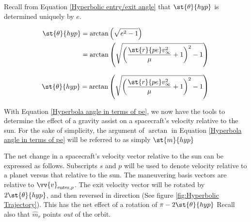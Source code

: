 \documentclass[../basicOrbitalDynamics.tex]{subfiles}
\begin{document}
Recall from Equation \eqref{Hyperbolic entry/exit angle} that $\st{\theta}{hyp}$ is determined uniquely by $e$.

\begin{align*}
    \st{\theta}{hyp} & =\arctan\left(\sqrt{e^2-1}\right)                                                \\
                      & =\arctan\left(\sqrt{\left(\frac{\st{r}{pe}v_\infty^2}{\mu}+1\right)^2-1}\right) \\
\end{align*}

\begin{equation}\label{Hyperbola angle in terms of pe}
    \st{\theta}{hyp}=\arctan\left(\sqrt{\left(\frac{\st{r}{pe}v_\infty^2}{\mu}+1\right)^2-1}\right)\\
\end{equation}

With Equation \eqref{Hyperbola angle in terms of pe}, we now have the tools to determine the effect of a gravity assist on a spacecraft's velocity relative to the sun. For the sake of simplicity, the argument of $\arctan$ in Equation \eqref{Hyperbola angle in terms of pe} will be referred to as simply $\st{m}{hyp}$

The net change in a spacecraft's velocity vector relative to the sun can be expressed as follows. Subscripts $s$ and $p$ will be used to denote velocity relative to a planet versus that relative to the sun. The maneuvering basis vectors are relative to $\vv{v}_{\text{enter},p}$. The exit velocity vector will be rotated by $2\st{\theta}{hyp}$, and then reversed in direction (See figure \ref{fig:Hyperbolic Trajectory}). This has the net effect of a rotation of $\pi-2\st{\theta}{hyp}$ Recall also that $\hat{m}_r$ points \textit{out} of the orbit.
\end{document}

